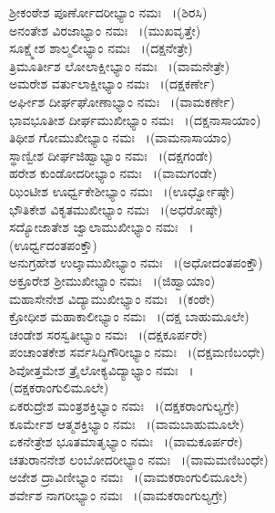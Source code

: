   ಶ್ರೀಕಂಠೇಶ ಪೂರ್ಣೋದರೀಭ್ಯಾಂ ನಮಃ ~।(ಶಿರಸಿ)\\
  ಅನಂತೇಶ ವಿರಜಾಭ್ಯಾಂ ನಮಃ  ~।(ಮುಖವೃತ್ತೇ)\\
  ಸೂಕ್ಷ್ಮೇಶ ಶಾಲ್ಮಲೀಭ್ಯಾಂ ನಮಃ  ~।(ದಕ್ಷನೇತ್ರೇ)\\
  ತ್ರಿಮೂರ್ತೀಶ ಲೋಲಾಕ್ಷೀಭ್ಯಾಂ ನಮಃ  ~।(ವಾಮನೇತ್ರೇ)\\
  ಅಮರೇಶ ವರ್ತುಲಾಕ್ಷೀಭ್ಯಾಂ ನಮಃ  ~।(ದಕ್ಷಕರ್ಣೇ)\\
  ಅರ್ಘೀಶ ದೀರ್ಘಘೋಣಾಭ್ಯಾಂ ನಮಃ  ~।(ವಾಮಕರ್ಣೇ)\\
  ಭಾವಭೂತೀಶ ದೀರ್ಘಮುಖೀಭ್ಯಾಂ ನಮಃ  ~।(ದಕ್ಷನಾಸಾಯಾಂ)\\
  ತಿಥೀಶ ಗೋಮುಖೀಭ್ಯಾಂ ನಮಃ  ~।(ವಾಮನಾಸಾಯಾಂ)\\
  ಸ್ಥಾಣ್ವೀಶ ದೀರ್ಘಜಿಹ್ವಾಭ್ಯಾಂ ನಮಃ  ~।(ದಕ್ಷಗಂಡೇ)\\
  ಹರೇಶ ಕುಂಡೋದರೀಭ್ಯಾಂ ನಮಃ  ~।(ವಾಮಗಂಡೇ)\\
  ಝಿಂಟೀಶ ಊರ್ಧ್ವಕೇಶೀಭ್ಯಾಂ ನಮಃ  ~।(ಊರ್ಧ್ವೋಷ್ಠೇ)\\
  ಭೌತಿಕೇಶ ವಿಕೃತಮುಖೀಭ್ಯಾಂ ನಮಃ  ~।(ಅಧರೋಷ್ಠೇ)\\
  ಸದ್ಯೋಜಾತೇಶ ಜ್ವಾಲಾಮುಖೀಭ್ಯಾಂ ನಮಃ  ~।\\(ಊರ್ಧ್ವದಂತಪಂಕ್ತೌ)\\
  ಅನುಗ್ರಹೇಶ ಉಲ್ಕಾಮುಖೀಭ್ಯಾಂ ನಮಃ  ~।(ಅಧೋದಂತಪಂಕ್ತೌ)\\
  ಅಕ್ರೂರೇಶ ಶ್ರೀಮುಖೀಭ್ಯಾಂ ನಮಃ  ~।(ಜಿಹ್ವಾಯಾಂ)\\
  ಮಹಾಸೇನೇಶ ವಿದ್ಯಾಮುಖೀಭ್ಯಾಂ ನಮಃ  ~।(ಕಂಠೇ)\\
  ಕ್ರೋಧೀಶ ಮಹಾಕಾಲೀಭ್ಯಾಂ ನಮಃ  ~।(ದಕ್ಷ ಬಾಹುಮೂಲೇ)\\
  ಚಂಡೇಶ ಸರಸ್ವತೀಭ್ಯಾಂ ನಮಃ  ~।(ದಕ್ಷಕೂರ್ಪರೇ)\\
  ಪಂಚಾಂತಕೇಶ ಸರ್ವಸಿದ್ಧಿಗೌರೀಭ್ಯಾಂ ನಮಃ  ~।(ದಕ್ಷಮಣಿಬಂಧೇ)\\
  ಶಿವೋತ್ತಮೇಶ ತ್ರೈಲೋಕ್ಯವಿದ್ಯಾಭ್ಯಾಂ ನಮಃ  ~।\\(ದಕ್ಷಕರಾಂಗುಲಿಮೂಲೇ)\\
  ಏಕರುದ್ರೇಶ ಮಂತ್ರಶಕ್ತಿಭ್ಯಾಂ ನಮಃ  ~।(ದಕ್ಷಕರಾಂಗುಲ್ಯಗ್ರೇ)\\
  ಕೂರ್ಮೇಶ ಆತ್ಮಶಕ್ತಿಭ್ಯಾಂ ನಮಃ  ~।(ವಾಮಬಾಹುಮೂಲೇ)\\
  ಏಕನೇತ್ರೇಶ ಭೂತಮಾತೃಭ್ಯಾಂ ನಮಃ  ~।(ವಾಮಕೂರ್ಪರೇ)\\
  ಚತುರಾನನೇಶ ಲಂಬೋದರೀಭ್ಯಾಂ ನಮಃ  ~।(ವಾಮಮಣಿಬಂಧೇ)\\
  ಅಜೇಶ ದ್ರಾವಿಣೀಭ್ಯಾಂ ನಮಃ  ~।(ವಾಮಕರಾಂಗುಲಿಮೂಲೇ)\\
  ಶರ್ವೇಶ ನಾಗರೀಭ್ಯಾಂ ನಮಃ  ~।(ವಾಮಕರಾಂಗುಲ್ಯಗ್ರೇ)\\
